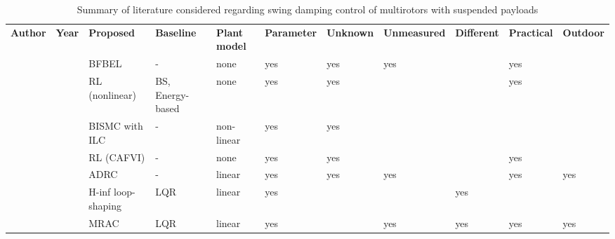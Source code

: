 \begin{landscape}
{\begin{table}[!htbp]
    \renewcommand{\arraystretch}{0.9}
    \centering
    \caption{Summary of literature considered regarding swing damping control of multirotors with suspended payloads}
    \begin{tabularx}{\linewidth}{@{}lllllllllll@{}}
            \textbf{Author}              & \textbf{Year}                   & \textbf{Proposed}          & \textbf{Baseline}      & \textbf{Plant model} & \textbf{Parameter} & \textbf{Unknown} & \textbf{Unmeasured} & \textbf{Different} & \textbf{Practical} & \textbf{Outdoor} \\
            \citet{Muthusamy2021a}       & \citeyear{Muthusamy2021a}       & \gls{BFBEL}                & -                      & none                 & yes                & yes              & yes                 &                    & yes                &                  \\
            \citet{Hua2021}              & \citeyear{Hua2021}              & \gls{RL} (nonlinear)       & \gls{BS}, Energy-based & none                 & yes                & yes              &                     &                    & yes                &                  \\
            \citet{Allahverdy2021}       & \citeyear{Allahverdy2021}       & \gls{BISMC} with \gls{ILC} & -                      & non-linear           & yes                & yes              &                     &                    &                    &                  \\
            \citet{Faust2014}            & \citeyear{Faust2014}            & \gls{RL} (\gls{CAFVI})     & -                      & none                 & yes                & yes              &                     &                    & yes                &                  \\
            \citet{Wang2020}             & \citeyear{Wang2020}             & \gls{ADRC}                 & -                      & linear               & yes                & yes              & yes                 &                    & yes                & yes              \\
            \citet{Taylor2020}           & \citeyear{Taylor2020}           & \gls{H-inf} loop-shaping   & \gls{LQR}              & linear               & yes                &                  &                     & yes                &                    &                  \\
            \citet{Erasmus2020}          & \citeyear{Erasmus2020}          & \gls{MRAC}                 & \gls{LQR}              & linear               & yes                &                  & yes                 & yes                & yes                & yes              \\

\end{tabularx}
\end{table}}
\end{landscape}
